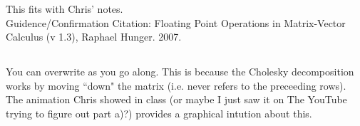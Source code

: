 \documentclass{article}\usepackage[]{graphicx}\usepackage[]{color}
\begin{document}
This fits with Chris' notes.\\

Guidence/Confirmation Citation: Floating Point Operations in Matrix-Vector Calculus (v 1.3), Raphael Hunger. 2007.

\subsection{}

You can overwrite as you go along.  This is because the Cholesky decomposition works by moving ``down" the matrix (i.e. never refers to the preceeding rows).  The animation Chris showed in class (or maybe I just saw it on The YouTube trying to figure out part a)?) provides a graphical intution about this.

\subsection{}
\end{document}
